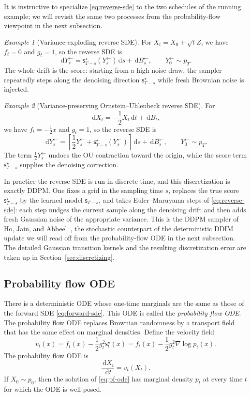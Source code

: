 \documentclass{amsart}
\numberwithin{equation}{section}
\theoremstyle{plain}
\theoremstyle{definition}
\theoremstyle{remark}
\newtheorem*{example}{Example}
\newcommand{\dd}{\,\mathrm{d}}
\newcommand{\sstar}{\mathsf{s}^{\star}}
\newcommand{\score}{\mathsf{s}}
\begin{document}
It is instructive to specialize \eqref{eq:reverse-sde} to the two schedules of
the running example; we will revisit the same two processes from the
probability-flow viewpoint in the next subsection.

\begin{example}[Variance-exploding reverse SDE]
For $X_t=X_0+\sqrt t Z$, we have $f_t=0$ and $g_t=1$, so the reverse SDE is
\[
    \dd Y^{\leftarrow}_s=\sstar_{T-s}(Y^{\leftarrow}_s)\dd s+\dd B^{\leftarrow}_s,
    \qquad Y^{\leftarrow}_0\sim p_T.
\]
The whole drift is the score: starting from a high-noise draw, the sampler
repeatedly steps along the denoising direction $\sstar_{T-s}$ while fresh
Brownian noise is injected.
\end{example}

\begin{example}[Variance-preserving Ornstein--Uhlenbeck reverse SDE]
For
\[
    \dd X_t=-\frac12X_t\dd t+\dd B_t,
\]
we have $f_t=-\frac12x$ and $g_t=1$, so the reverse SDE is
\[
    \dd Y^{\leftarrow}_s=\left[\frac12 Y^{\leftarrow}_s+\sstar_{T-s}(Y^{\leftarrow}_s)\right]\dd s+\dd B^{\leftarrow}_s,
    \qquad Y^{\leftarrow}_0\sim p_T.
\]
The term $\frac12 Y^{\leftarrow}_s$ undoes the OU contraction toward the origin, while the
score term $\sstar_{T-s}$ supplies the denoising correction.
\end{example}

In practice the reverse SDE is run in discrete time, and this discretization is
exactly DDPM\@.  One fixes a grid in the sampling time $s$, replaces the true
score $\sstar_{T-s}$ by the learned model $\score_{T-s}$, and takes
Euler--Maruyama steps of \eqref{eq:reverse-sde}: each step nudges the current
sample along the denoising drift and then adds fresh Gaussian noise of the
appropriate variance.  This is the DDPM sampler of Ho, Jain, and
Abbeel~\cite{ho2020ddpm}, the stochastic counterpart of the deterministic DDIM
update we will read off from the probability-flow ODE in the next subsection.
The detailed Gaussian transition kernels and the resulting discretization error
are taken up in Section~\ref{sec:discretizing}.

\subsection{Probability flow ODE}

There is a deterministic ODE whose one-time marginals are the same as those of
the forward SDE \eqref{eq:forward-sde}.  This ODE is called the
\emph{probability flow ODE}. The probability flow ODE replaces
Brownian randomness by a transport field that has the same effect on
marginal densities. Define the velocity field
\begin{equation}\label{eq:pf-velocity}
    v_t(x)
    =
    f_t(x)-\frac12 g_t^2\sstar_t(x)
    =
    f_t(x)-\frac12 g_t^2\nabla\log p_t(x).
\end{equation}
The probability flow ODE is
\begin{equation}\label{eq:pf-ode}
    \frac{\dd X_t}{\dd t}=v_t(X_t).
\end{equation}
If $X_0\sim p_0$, then the solution of \eqref{eq:pf-ode} has marginal density
$p_t$ at every time $t$ for which the ODE is well posed.
\end{document}
